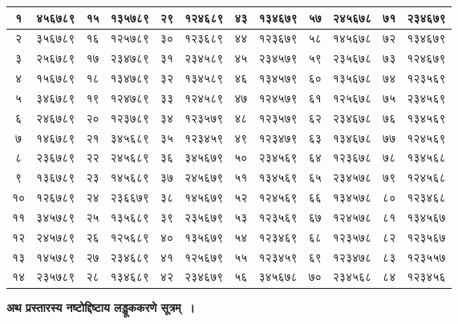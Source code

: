 \documentclass[11pt, openany]{book}
\begin{document}
\begin{table}[h]
	\setlength{\extrarowheight}{2pt} \setlength{\tabcolsep}{2pt}
	\centering
	
\begin{tabular}{|c|c|c|c|c|c|c|c|c|c|c|c|}
	\hline
१ & ४५६७८९ & १५ & १३५७८९ &२९ & १२४६८९ & ४३ & १३४६७९  & ५७ & २४५६७८ & ७१ & २३४६७९ \\
\hline
२ & ३५६७८९ & १६ & १२५७८९ & ३० & १२३६८९ &  ४४ & १२३६७९ & ५८ & १४५६७८ & ७२ & १३४६७९ \\
\hline
३ & २५६७८९ & १७ & २३४७८९ & ३१ & २३४५८९ & ४५ & २३४५७९ & ५९ & २३५६७८ & ७३ & १२४६७९ \\
\hline 
४ & १५६७८९ & १८ & १३४७८९ & ३२ & १३४५८९ & ४६ & १३४५७९ & ६० & १३५६७८ & ७४ & १२३५६९ \\
\hline
५ & ३४६७८९ & १९ & १२४७८९  & ३३ & १२४५८९ & ४७ & १२४५७९ & ६१ & १२५६७८ & ७५ & २३४५६९ \\
\hline
६ & २४६७८९  & २० &  १२३७८९ & ३४ & १२३५७९ & ४८ & १२३५७९ &  ६२ & २३४६७८ &  ७६& १३४५६९ \\
\hline
७ & १४६७८९ & २१ &  ३४५६८९ & ३५ & १२३४५९ &  ४९ & १२३४७९ &  ६३ & १३४६७८ &  ७७ & १२४५६९ \\
\hline
८ & २३६७८९ & २२ &  २४५६८९ & ३६ & ३४५६७९ &  ५० & २३४५६९ &  ६४ & १२३६७८ &  ७८ & १३४५६८\\
\hline
९ & १३६७८९ & २३ & १४५६८९ & ३७ & २४५६७९  & ५१ & १३४५६९ & ६५ & २३४५७८ &  ७९ & १२४५६८  \\
\hline 
१०  & १२६७८९ & २४ & २३६६७९ & ३८  & १४५६७९ & ५२ & १२४५६९ & ६६ & १३४५७८ &  ८० & १२३४६८\\
\hline 
११   & ३४५७८९ & २५ & १३५६८९ & ३९  & २३५६७९ & ५३ & १२३५६९ & ६७ & १२४५७८ &  ८१ & १३४५६७\\
\hline 
१२   & २४५७८९ & २६ & १२५६८९ & ४०  & १३५६७९ & ५४ & १२३४६९ & ६८  & १२३५७८ &  ८२ & १२३५६७\\
\hline 
१३   & १४५७८९  & २७ & २३४६८९ & ४१  & १२५६७९ & ५५ & १२३४५९ & ६९  & १२३४७८ &  ८३ & १२३५५७\\
\hline 
१४   & २३५७८९ & २८ & १३४६८९ & ४२  & २३४६७९ & ५६ & ३४५६७८ & ७०  & २३४५६८ &  ८४ & १२३४५६\\
\hline 
 
\end{tabular}	
\end{table}
 
\newpage

\textbf{अथ प्रस्तारस्य नष्टोद्दिष्टाय लड्डूककरणे सूत्रम्~।}
\end{document}

